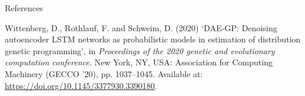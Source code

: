 \documentclass[
  ignorenonframetext,
]{beamer}
\newlength{\cslhangindent}
\newlength{\cslentryspacingunit} %
\newenvironment{CSLReferences}[2] %
 {%
  \setlength{\parindent}{0pt}
  \ifodd #1
  \let\oldpar\par
  \def\par{\hangindent=\cslhangindent\oldpar}
  \fi
  \setlength{\parskip}{#2\cslentryspacingunit}
 }%
 {}
\begin{document}
\begin{frame}[allowframebreaks]{References}
\begin{CSLReferences}{0}{0}
\leavevmode{}%
Wittenberg, D., Rothlauf, F. and Schweim, D. (2020) {`DAE-GP: Denoising
autoencoder LSTM networks as probabilistic models in estimation of
distribution genetic programming'}, in \emph{Proceedings of the 2020
genetic and evolutionary computation conference}. New York, NY, USA:
Association for Computing Machinery (GECCO '20), pp. 1037--1045.
Available at: \url{https://doi.org/10.1145/3377930.3390180}.

\end{CSLReferences}
\end{frame}
\end{document}
